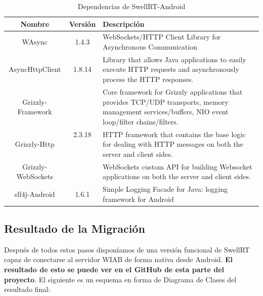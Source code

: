     \begin{table}[h]
      \footnotesize
      \begin{center}
	\begin{tabular}{ | c | c | m{8cm} | }
	  \hline
	  \textbf{Nombre} & \textbf{Versión} & \textbf{Descripción} \\
	  \hline
	  WAsync \cite{ref:wAsync_github} & 1.4.3 & WebSockets/HTTP Client Library for Asynchronous Communication \\ 
	  \hline
	  AsyncHttpClient \cite{ref:asyncHttpClient} & 1.8.14 & Library that allows Java applications to easily execute HTTP requests and asynchronously process the HTTP responses.\\ 
	  \hline
	  Grizzly-Framework \cite{ref:grizzly} & \multirow{3}{*}{2.3.18} & Core framework for Grizzly applications that provides TCP/UDP transports, memory management services/buffers, NIO event loop/filter chains/filters. \\ \cline{1-1} \cline{3-3} 
	  Grizzly-Http \cite{ref:grizzly} & & HTTP framework that contains the base logic for dealing with HTTP messages on both the server and client sides. \\ 
	  \cline{1-1} \cline{3-3} 
	  Grizzly-WebSockets \cite{ref:grizzly} & & WebSockets custom API for building Websocket applications on both the server and client sides. \\ 
	  \hline
	  slf4j-Android \cite{ref:slf4j_android} & 1.6.1 & Simple Logging Facade for Java: logging framework for Android \\ 
	  \hline
	\end{tabular}
      \end{center}
      \caption{Dependencias de SwellRT-Android}
      \label{fig:dependencies_swellRT}
    \end{table}       
       
    \subsection{Resultado de la Migración} \label{ref:migrationResult}
    
    Después de todos estos pasos disponíamos de una versión funcional de SwellRT capaz de conectarse al servidor WIAB de forma nativa desde Android. \textbf{El resultado de esto se puede ver en el GitHub de esta parte del proyecto}\cite{ref:wave_migration_github}. El siguiente es un esquema en forma de Diagrama de Clases del resultado final:
    
